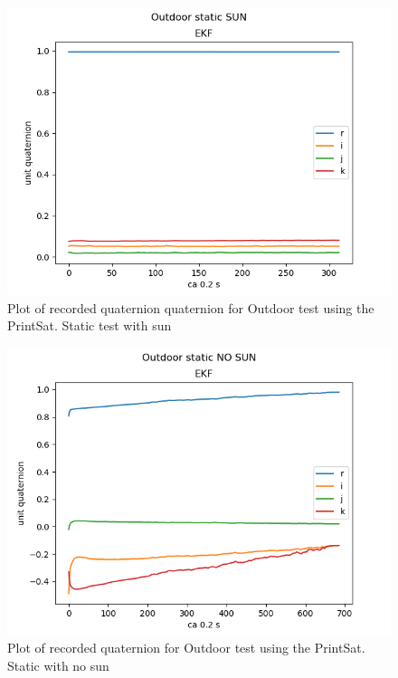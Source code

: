 \begin{figure}[tbp]
	\centering
	\includegraphics[width=1\columnwidth]{./Pictures/run3OutdoorStaticSUN}
	\caption{Plot of recorded quaternion quaternion for Outdoor test using the PrintSat. Static test with sun}
	\label{fig:Outdoor3RotNoSun}
\end{figure}

\begin{figure}[tbp]
	\centering
	\includegraphics[width=1\columnwidth]{./Pictures/run3OutdoorStaticNOSUN}
	\caption{Plot of recorded quaternion for Outdoor test using the PrintSat. Static with  no sun}
	\label{fig:Outdoor3RotNoSun}
\end{figure}         


